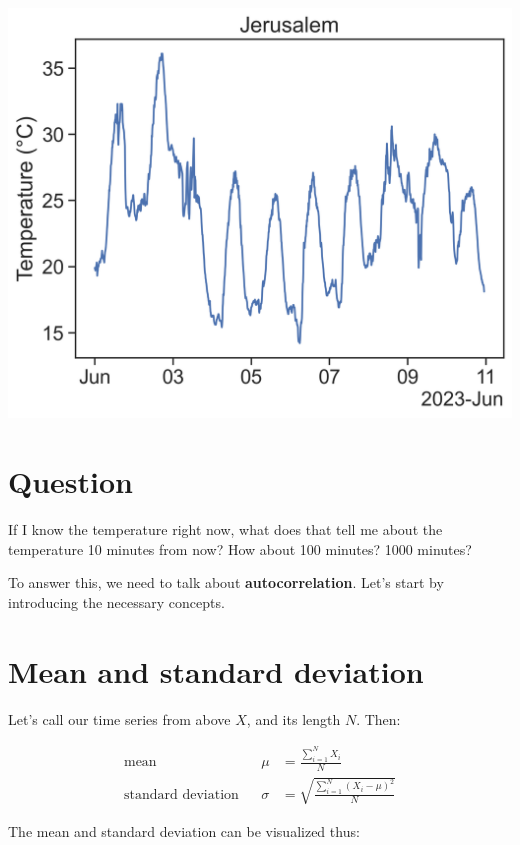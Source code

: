 \documentclass[
  letterpaper,
  DIV=11,
  numbers=noendperiod,
  oneside]{scrreprt}
\begin{document}
\includegraphics{stationarity/jer_temp1.png}

\hypertarget{question}{%
\section{Question}\label{question}}

If I know the temperature right now, what does that tell me about the
temperature 10 minutes from now? How about 100 minutes? 1000 minutes?

To answer this, we need to talk about \textbf{autocorrelation}. Let's
start by introducing the necessary concepts.

\hypertarget{mean-and-standard-deviation}{%
\section{Mean and standard
deviation}\label{mean-and-standard-deviation}}

Let's call our time series from above \(X\), and its length \(N\). Then:

\[
\begin{aligned}
\text{mean}& &\mu &= \frac{\displaystyle\sum_{i=1}^N X_i}{N} \\
\text{standard deviation}& &\sigma &= \sqrt{\frac{\displaystyle\sum_{i=1}^N (X_i-\mu)^2}{N}}
\end{aligned}
\]

The mean and standard deviation can be visualized thus:
\end{document}
